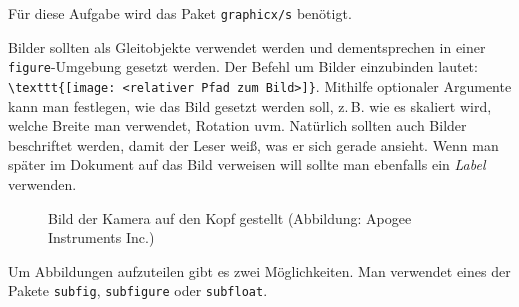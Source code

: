 
Für diese Aufgabe wird das Paket \verb+graphicx/s+ benötigt.

Bilder sollten als Gleitobjekte verwendet werden und dementsprechen in einer \verb+figure+-Umgebung gesetzt werden. Der Befehl um Bilder einzubinden lautet: \verb+\texttt{[image: <relativer Pfad zum Bild>]}+. Mithilfe optionaler Argumente kann man festlegen, wie das Bild gesetzt werden soll, z.\,B. wie es skaliert wird, welche Breite man verwendet, Rotation uvm. Natürlich sollten auch Bilder beschriftet werden, damit der Leser weiß, was er sich gerade ansieht. Wenn man später im Dokument auf das Bild verweisen will sollte man ebenfalls ein \emph{Label} verwenden.
\begin{lcode}
  \begin{figure}
    \centering
{}
    \caption{Bild der Kamera auf den Kopf gestellt
             (Abbildung: Apogee Instruments Inc.)}
    \label{fig:cameraupsidedown}
  \end{figure}
\end{lcode}
{\centering
\label{fig:cameraupsidedown}}

Um Abbildungen aufzuteilen gibt es zwei Möglichkeiten. Man verwendet eines der Pakete \verb+subfig+, \verb+subfigure+ oder \verb+subfloat+.

